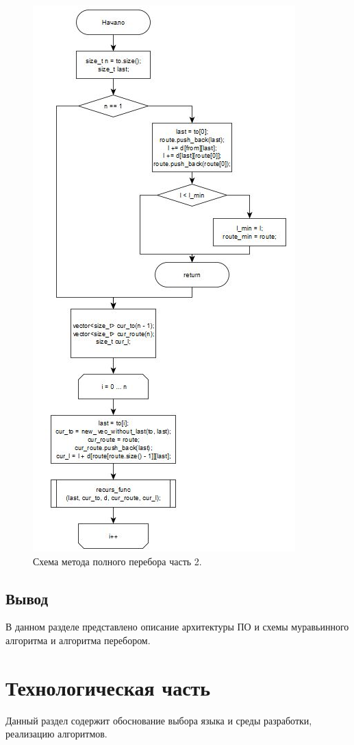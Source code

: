 \documentclass[a4paper,oneside,14pt]{extreport}
\begin{document}
\begin{figure}[H]
	\begin{center}
		\includegraphics[scale=1]{images/enumeration2.png}
		\caption{Схема метода полного перебора часть 2.}
		\label{fig:en2}
	\end{center}
\end{figure}

\section*{Вывод}
В данном разделе представлено описание архитектуры ПО и схемы  муравьинного алгоритма и алгоритма перебором.

\chapter{Технологическая часть}
Данный раздел содержит обоснование выбора языка и среды разработки, реализацию алгоритмов.
\end{document}
